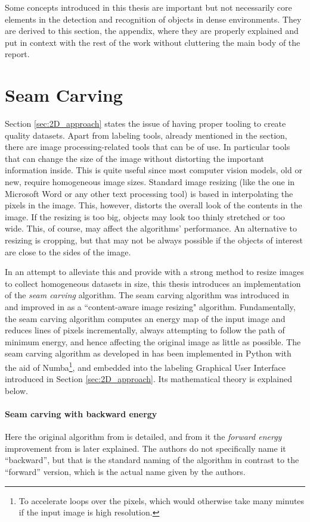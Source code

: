 \documentclass[../main.tex]{subfiles}
\begin{document}
Some concepts introduced in this thesis are important but not necessarily core elements in the detection and recognition of objects in dense environments. They are derived to this section, the appendix, where they are properly explained and put in context with the rest of the work without cluttering the main body of the report.

\section{Seam Carving} \label{sec:seam_carving}
Section \ref{sec:2D_approach} states the issue of having proper tooling to create quality datasets. Apart from labeling tools, already mentioned in the section, there are image processing-related tools that can be of use. In particular tools that can change the size of the image without distorting the important information inside. This is quite useful since most computer vision models, old or new, require homogeneous image sizes. Standard image resizing (like the one in Microsoft Word or any other text processing tool) is based in interpolating the pixels in the image. This, however, distorts the overall look of the contents in the image. If the resizing is too big, objects may look too thinly stretched or too wide. This, of course, may affect the algorithms' performance. An alternative to resizing is cropping, but that may not be always possible if the objects of interest are close to the sides of the image. 

In an attempt to alleviate this and provide with a strong method to resize images to collect homogeneous datasets in size, this thesis introduces an implementation of the \emph{seam carving} algorithm. The seam carving algorithm was introduced in \cite{seamcarving} and improved in \cite{seamcarving_improved} as a ``content-aware image resizing" algorithm. Fundamentally, the seam carving algorithm computes an energy map of the input image and reduces lines of pixels incrementally, always attempting to follow the path of minimum energy, and hence affecting the original image as little as possible. The seam carving algorithm as developed in \cite{seamcarving_improved} has been implemented in Python with the aid of Numba\footnote{To accelerate loops over the pixels, which would otherwise take many minutes if the input image is high resolution.}, and embedded into the labeling Graphical User Interface introduced in Section \ref{sec:2D_approach}. Its mathematical theory is explained below.

\paragraph{Seam carving with backward energy}
Here the original algorithm from \cite{seamcarving} is detailed, and from it the \emph{forward energy} improvement from \cite{seamcarving_improved} is later explained. The authors do not specifically name it ``backward'', but that is the standard naming of the algorithm in contrast to the ``forward'' version, which is the actual name given by the authors.
\end{document}
